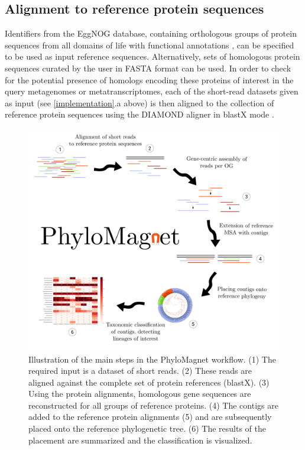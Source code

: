 \documentclass{bioinfo}
\begin{document}
\begin{methods}
\subsection{Alignment to reference protein sequences}
Identifiers from the EggNOG database, containing orthologous groups of protein sequences from all domains of life with functional annotations \citep{Huerta-cepas2016b}, can be specified to be used as input reference sequences. Alternatively, sets of homologous protein sequences curated by the user in FASTA format can be used. In order to check for the potential presence of homologs encoding these proteins of interest in the query metagenomes or metatranscriptomes, each of the short-read datasets given as input (see \ref{implementation}.a above) is then aligned to the collection of reference protein sequences using the DIAMOND aligner in blastX mode \citep[Fig. \ref{fig:01}:2;][]{Buchfink2014}.

\begin{figure}[!tpb]
\centerline{\includegraphics[width=.45\textwidth]{Fig1.pdf}}
\caption{Illustration of the main steps in the PhyloMagnet workflow. (1) The required input is a dataset of short reads. (2) These reads are aligned against the complete set of protein references (blastX). (3) Using the protein alignments, homologous gene sequences are reconstructed for all groups of reference proteins. (4) The contigs are added to the reference protein alignments (5) and are subsequently placed onto the reference phylogenetic tree. (6) The results of the placement are summarized and the classification is visualized.}\label{fig:01}
\end{figure}



\end{methods}
\end{document}
